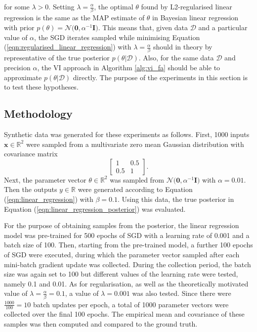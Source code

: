 \documentclass[msc,deptreport.inf]{infthesis} %
\newcommand{\matr}[1]{\mathbf{#1}}
\newcommand{\R}{\mathbb R}
\begin{document}
for some $\lambda > 0$. Setting $\lambda = \frac{\alpha}{\beta}$, the optimal $\theta$ found by L2-regularised linear regression is the same as the MAP estimate of $\theta$ in Bayesian linear regression with prior $p(\theta) = \mathcal{N}\big(\matr{0}, \alpha^{-1} \matr{I} \big)$. This means that, given data $\mathcal{D}$ and a particular value of $\alpha$, the SGD iterates sampled while minimising Equation (\ref{eqn:regularised_linear_regression}) with $\lambda = \frac{\alpha}{\beta}$ should in theory by representative of the true posterior $p(\theta | \mathcal{D})$. Also, for the same data $\mathcal{D}$ and precision $\alpha$, the VI approach in Algorithm \ref{alg:vi_fa} should be able to approximate $p(\theta | \mathcal{D})$ directly. The purpose of the experiments in this section is to test these hypotheses. 
 
\subsection{Methodology}

Synthetic data was generated for these experiments as follows. First, 1000 inputs $\matr{x} \in \R^2$ were sampled from a multivariate zero mean Gaussian distribution with covariance matrix
\begin{equation}
	\begin{bmatrix}
		1 & 0.5 \\
		0.5 & 1
	\end{bmatrix}.
\end{equation}
Next, the parameter vector $\theta \in \R^2$ was sampled from $\mathcal{N}\big(\matr{0}, \alpha^{-1} \matr{I} \big)$ with $\alpha = 0.01$. Then the outputs $y \in \R$ were generated according to Equation (\ref{eqn:linear_regression}) with $\beta = 0.1$. Using this data, the true posterior in Equation (\ref{eqn:linear_regression_posterior}) was evaluated. 

For the purpose of obtaining samples from the posterior, the linear regression model was pre-trained for 500 epochs of SGD with a learning rate of 0.001 and a batch size of 100. Then, starting from the pre-trained model, a further 100 epochs of SGD were executed, during which the parameter vector sampled after each mini-batch gradient update was collected. During the collection period, the batch size was again set to 100 but different values of the learning rate were tested, namely 0.1 and 0.01. As for regularisation, as well as the theoretically motivated value of $\lambda = \frac{\alpha}{\beta} = 0.1$, a value of $\lambda = 0.001$ was also tested. Since there were $\frac{1000}{100} = 10$ batch updates per epoch, a total of 1000 parameter vectors were collected over the final 100 epochs. The empirical mean and covariance of these samples was then computed and compared to the ground truth. 
\end{document}
